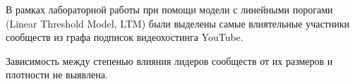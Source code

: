 
В рамках лабораторной работы при помощи модели с линейными порогами (Linear Threshold Model, LTM) были выделены самые влиятельные участники сообществ из графа подписок видеохостинга YouTube.

Зависимость между степенью влияния лидеров сообществ от их размеров и плотности не выявлена.
